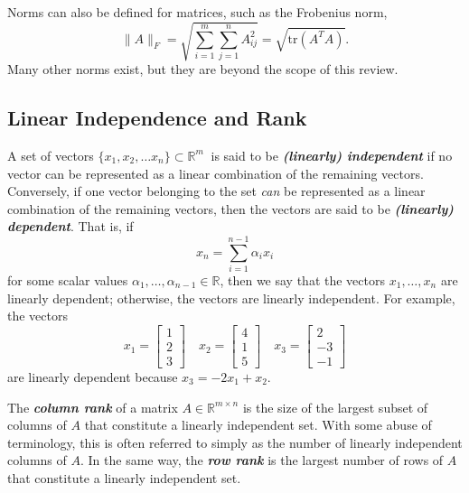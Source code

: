 \documentclass[12pt]{article}
\begin{document}
Norms can also be defined for matrices, such as the Frobenius norm,
\[\|A\|_F = \sqrt{\sum_{i=1}^m \sum_{j=1}^n A_{ij}^2} =
\sqrt{\mathrm{tr}(A^T A)}. \] Many other norms exist, but they are
beyond the scope of this review.

\subsection{Linear Independence and Rank}
A set of vectors $\{x_1, x_2, \ldots x_n\} \subset \mathbb{R}^m\ $ is said to be
\textbf{\textit{(linearly) independent}} if no vector can be represented
as a linear combination of the remaining vectors.  Conversely, if one
vector belonging to the set \textit{can} be represented as a linear combination of
the remaining vectors, then the vectors are said to be \textbf{\textit{(linearly)
    dependent}}.  That is, if
\[x_n = \sum_{i=1}^{n-1} \alpha_i x_i\]
for some scalar values $\alpha_1, \ldots, \alpha_{n-1} \in \mathbb{R}$, then we say that
the vectors $x_1, \ldots, x_n$ are linearly dependent; otherwise, the vectors are
linearly independent.  For example, the vectors
\[
x_1 = \left[ \begin{array}{c} 1 \\ 2 \\ 3 \end{array} \right] \quad 
x_2 = \left[ \begin{array}{c} 4 \\ 1 \\ 5 \end{array} \right] \quad 
x_3 = \left[ \begin{array}{c} 2 \\ -3 \\ -1 \end{array} \right] 
\]
are linearly dependent because $x_3 = -2x_1 + x_2$.

The \textbf{\textit{column rank}} of a matrix $A \in \mathbb{R}^{m \times n}$ is the 
size of the largest subset of columns of $A$ that constitute a linearly independent
set.  With some abuse of terminology, this is often referred to simply as the number of linearly
independent columns of $A$.  In the same way, the
\textbf{\textit{row rank}} is the largest number of rows of $A$ that
constitute a linearly independent set.
\end{document}

